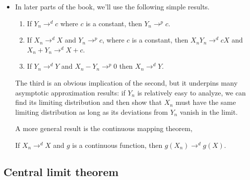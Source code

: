\begin{itemize}
\item In later parts of the book, we'll use the following simple
  results.
  \begin{enumerate}
  \item If $Y_n \to^d c$ where $c$ is a constant, then $Y_n \to^p c$.
  \item If $X_n \to^d X$ and $Y_n \to^p c$, where $c$ is a constant, then
    $X_n Y_n \to^d c X$ and $X_n + Y_n \to^d X + c$.
  \item If $Y_n \to^d Y$ and $X_n - Y_n \to^p 0$ then $X_n \to^d Y$.
  \end{enumerate}
  The third is an obvious implication of the second, but it underpins
  many asymptotic approximation results: if $Y_n$ is relatively easy
  to analyze, we can find its limiting distribution and then show
  that $X_n$ must have the same limiting distribution as long as its
  deviations from $Y_n$ vanish in the limit.

  A more general result is the continuous mapping theorem,
  \begin{thm}
    If $X_n \to^d X$ and $g$ is a continuous function, then $g(X_n) \to^d
    g(X)$.
  \end{thm}
  
\end{itemize}

\subsection{Central limit theorem}

